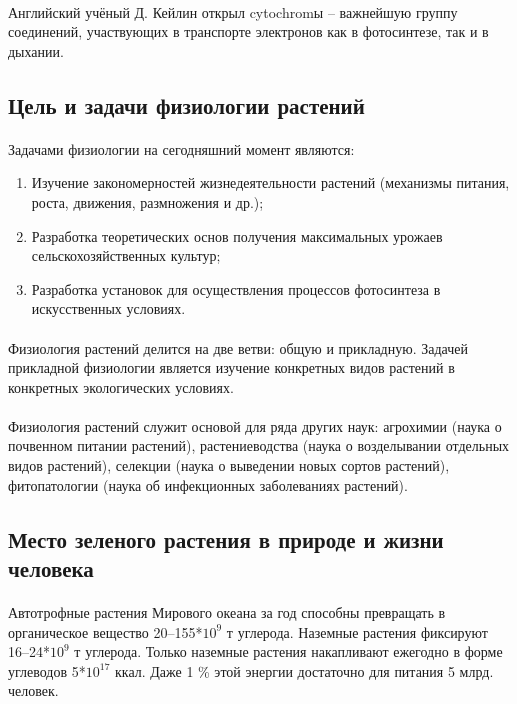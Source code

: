 \paragraph*{}Английский учёный Д. Кейлин открыл \gls{cytochrom}ы – важнейшую группу соединений, участвующих в транспорте электронов как в фотосинтезе, так и в дыхании.

\subsection*{Цель и задачи физиологии растений}



\paragraph*{}Задачами физиологии на сегодняшний момент являются:

\begin{enumerate}

	\item Изучение закономерностей жизнедеятельности растений (механизмы питания, роста, движения, размножения и др.); 
	\item Разработка теоретических основ получения максимальных урожаев сельскохозяйственных культур; 
	\item Разработка установок для осуществления процессов фотосинтеза в искусственных условиях.

\end{enumerate}

\paragraph*{}Физиология растений делится на две ветви: общую и прикладную. Задачей прикладной физиологии является изучение конкретных видов растений в конкретных экологических условиях.

\paragraph*{}Физиология растений служит основой для ряда других наук: агрохимии (наука о почвенном питании растений), растениеводства (наука о возделывании отдельных видов растений), селекции (наука о выведении новых сортов растений), фитопатологии (наука об инфекционных заболеваниях растений).

\subsection*{Место зеленого растения в природе и жизни человека}

\paragraph*{}Автотрофные растения Мирового океана за год способны превращать в органическое вещество 20–155*$10^{9}$ т углерода. Наземные растения фиксируют 16–24*$10^{9}$ т углерода. 
Только наземные растения накапливают ежегодно в форме углеводов 5*$10^{17}$ ккал. Даже 1 \% этой энергии достаточно для питания 5 млрд. человек. 